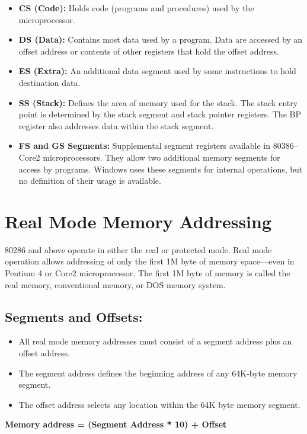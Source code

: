 \documentclass{article}
\begin{document}
\begin{itemize}
    \item \textbf{CS (Code):} Holds code (programs and procedures) used by the microprocessor.
    
    \item \textbf{DS (Data):} Contains most data used by a program. Data are accessed by an offset address or contents of other registers that hold the offset address.
    
    \item \textbf{ES (Extra):} An additional data segment used by some instructions to hold destination data.
    
    \item \textbf{SS (Stack):} Defines the area of memory used for the stack. The stack entry point is determined by the stack segment and stack pointer registers. The BP register also addresses data within the stack segment.
    
    \item \textbf{FS and GS Segments:} Supplemental segment registers available in 80386–Core2 microprocessors. They allow two additional memory segments for access by programs. Windows uses these segments for internal operations, but no definition of their usage is available.
\end{itemize}

\section*{Real Mode Memory Addressing}

80286 and above operate in either the real or protected mode. Real mode operation allows addressing of only the first 1M byte of memory space—even in Pentium 4 or Core2 microprocessor. The first 1M byte of memory is called the real memory, conventional memory, or DOS memory system.

\newpage

\subsection*{Segments and Offsets:}
\begin{itemize}
    \item All real mode memory addresses must consist of a segment address plus an offset address.
    \item The segment address defines the beginning address of any 64K-byte memory segment.
    \item The offset address selects any location within the 64K byte memory segment.
    \end{itemize}
\textbf{Memory address = (Segment Address * 10) + Offset}
\end{document}
